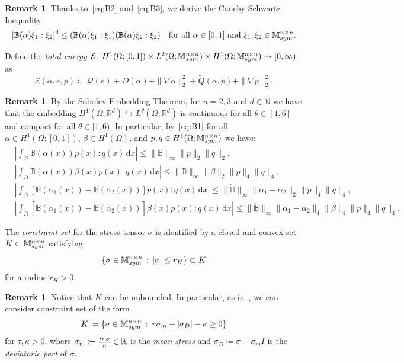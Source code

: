 \documentclass[reqno]{amsart}
\theoremstyle{definition}
\newtheorem{remark}[corollary]{Remark}
\numberwithin{equation}{section}
\def\tr {\mathop {\rm tr}\nolimits}
\def\de {\mathrm{d}}
\def\R {\mathbb R}
\def\N {\mathbb N}
\def\M {\mathbb M^{n\times n}_{\rm sym}}
\def\B {\mathbb B}
\begin{document}
\begin{remark}\label{rem:BCS}
Thanks to~\eqref{eq:B2} and~\eqref{eq:B3}, we derive the Cauchy-Schwartz Inequality \begin{equation*}
|\B(\alpha)\xi_1:\xi_2|^2\le (\B(\alpha)\xi_1:\xi_1)(\B(\alpha)\xi_2:\xi_2)\quad\text{for all $\alpha\in[0,1]$ and $\xi_1,\xi_2\in\M$}.
\end{equation*}
\end{remark}
Define the {\it total energy} $\mathcal E\colon H^1(\Omega;[0,1])\times L^2(\Omega;\M)\times H^1(\Omega;\M)\to [0,\infty)$ as
\begin{equation}\label{eq:tot_en}
\mathcal E(\alpha,e,p)\coloneqq \mathcal Q(e)+D(\alpha)+\|\nabla\alpha\|_2^2+\tilde Q(\alpha,p)+\|\nabla p\|_2^2.
\end{equation}

\begin{remark}\label{rem:emb}
By the Sobolev Embedding Theorem, for $n=2,3$ and $d\in\N$ we have that the embedding $H^1(\Omega;\R^d)\hookrightarrow L^\theta(\Omega;\R^d)$ is continuous for all $\theta\in[1,6]$ and compact for all $\theta\in[1,6)$. In particular, by~\eqref{eq:B1} for all $\alpha\in H^1(\Omega;[0,1])$, $\beta\in H^1(\Omega)$, and $p,q\in H^1(\Omega;\M)$ we have:
\begin{align*}
&\left|\int_\Omega \B(\alpha(x))p(x):q(x) \,\de x\right|\le \|\B\|_\infty\|p\|_2\|q\|_2,\\
&\left|\int_\Omega \dot{\B}(\alpha(x))\beta(x)p(x):q(x) \,\de x\right|\le \|\dot{\B}\|_\infty\|\beta\|_2\|p\|_4\|q\|_4,\\
&\left|\int_\Omega [\B(\alpha_1(x))-\B(\alpha_2(x))]p(x):q(x) \,\de x\right|\le \|\dot{\B}\|_\infty\|\alpha_1-\alpha_2\|_2\|p\|_4\|q\|_4,\\
&\left|\int_\Omega [\dot{\B}(\alpha_1(x))-\dot{\B}(\alpha_2(x))]\beta(x)p(x):q(x) \,\de x\right|\le \|\ddot{\B}\|_\infty\|\alpha_1-\alpha_2\|_4\|\beta\|_4\|p\|_4\|q\|_4.
\end{align*}
\end{remark}

The {\it constraint set} for the stress tensor $\sigma$ is identified by a closed and convex set  $K\subset\M$ satisfying
\begin{equation}\label{eq:K}
\{\sigma\in\M\,:\,|\sigma|\le r_H\}\subset K
\end{equation}
for a radius $r_H> 0$. 

\begin{remark}
Notice that $K$ can be unbounded. In particular, as in~\cite{Cr3}, we can consider constraint set of the form 
$$K\coloneqq\{\sigma\in\M\,:\,\tau\sigma_m+|\sigma_D|-\kappa\ge 0\}$$
for $\tau,\kappa>0$, where $\sigma_m\coloneqq\frac{\tr\sigma}{n}\in\R$ is the {\it mean stress} and $\sigma_D\coloneqq\sigma-\sigma_mI$ is the {\it deviatoric part} of $\sigma$.
\end{remark}
\end{document}
